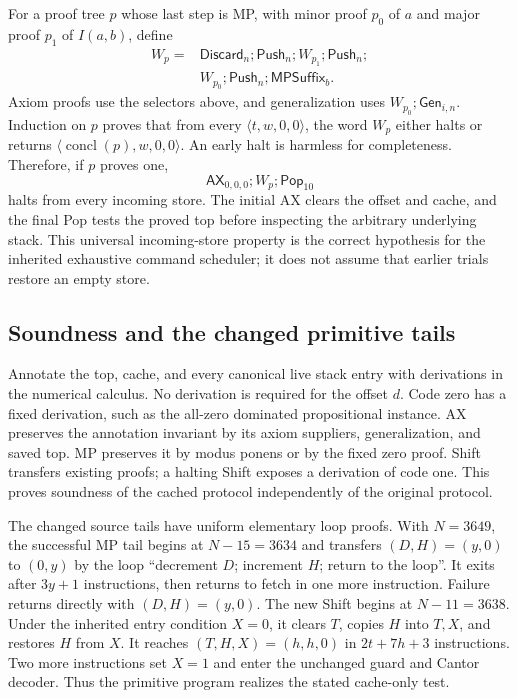 For a proof tree $p$ whose last step is MP, with minor proof $p_0$ of
$a$ and major proof $p_1$ of $I(a,b)$, define
\[
\begin{split}
 W_p={}&\mathsf{Discard}_n;\mathsf{Push}_n;
 W_{p_1};\mathsf{Push}_n;\\
 &W_{p_0};\mathsf{Push}_n;\mathsf{MPSuffix}_b.
\end{split}
\]
Axiom proofs use the selectors above, and generalization uses
$W_{p_0};\mathsf{Gen}_{i,n}$. Induction on $p$ proves that from every
$\langle t,w,0,0\rangle$, the word $W_p$ either halts or returns
$\langle\operatorname{concl}(p),w,0,0\rangle$. An early halt is harmless
for completeness. Therefore, if $p$ proves one,
\[
             \mathsf{AX}_{0,0,0};W_p;\mathsf{Pop}_{10}
\]
halts from every incoming store. The initial AX clears the offset and
cache, and the final Pop tests the proved top before inspecting the
arbitrary underlying stack. This universal incoming-store property is
the correct hypothesis for the inherited exhaustive command scheduler;
it does not assume that earlier trials restore an empty store.

\subsection{Soundness and the changed primitive tails}

Annotate the top, cache, and every canonical live stack entry with
derivations in the numerical calculus. No derivation is required for
the offset $d$. Code zero has a fixed derivation, such as the all-zero
dominated propositional instance. AX preserves the annotation invariant
by its axiom suppliers, generalization, and saved top. MP preserves it
by modus ponens or by the fixed zero proof. Shift transfers existing
proofs; a halting Shift exposes a derivation of code one. This proves
soundness of the cached protocol independently of the original protocol.

The changed source tails have uniform elementary loop proofs. With
$N=3649$, the successful MP tail begins at $N-15=3634$ and transfers
$(D,H)=(y,0)$ to $(0,y)$ by the loop
``decrement $D$; increment $H$; return to the loop''. It exits after
$3y+1$ instructions, then returns to fetch in one more instruction.
Failure returns directly with $(D,H)=(y,0)$.
The new Shift begins at $N-11=3638$. Under the inherited entry condition
$X=0$, it clears $T$, copies $H$ into $T,X$, and restores $H$ from $X$.
It reaches $(T,H,X)=(h,h,0)$ in $2t+7h+3$ instructions. Two more
instructions set $X=1$ and enter the unchanged guard and Cantor decoder.
Thus the primitive program realizes the stated cache-only test.

